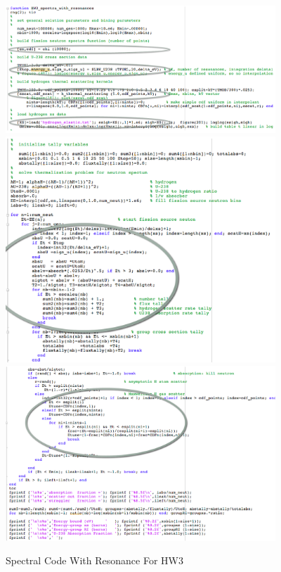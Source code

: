\documentclass{school-22.211-notes}
\begin{document}
\begin{figure}
  \centering
  \includegraphics[width=4in]{images/spectral-code-11.png}
  \\
  \includegraphics[width=4in]{images/spectral-code-12.png}
  \\
  \includegraphics[width=4in]{images/spectral-code-13.png}
  \caption{Spectral Code With Resonance For HW3}
\end{figure}
\end{document}
